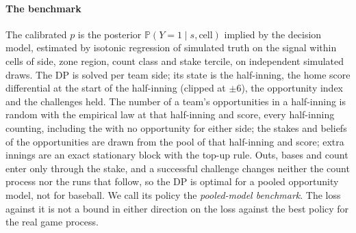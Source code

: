 \documentclass[aoas]{imsart}
\theoremstyle{plain}
\theoremstyle{definition}
\newcommand{\Prob}{\mathbb{P}}
\begin{document}
\paragraph{The benchmark} The calibrated $p$ is the posterior $\Prob(Y=1\mid s,\text{cell})$ implied by the decision
model, estimated by isotonic regression \citep{BarlowEtAl1972} of simulated truth on the signal within cells of side,
zone region, count class and stake tercile, on independent simulated draws. The DP is solved per team side; its state
is the half-inning, the home score differential at the start of the half-inning (clipped at $\pm6$), the opportunity
index and the challenges held. The number of a team's opportunities in a half-inning is random with the empirical law
at that half-inning and score, every half-inning counting, including the \NHalvesZero{} with no opportunity for either
side; the stakes and beliefs of the opportunities are drawn from the pool of that half-inning and score; extra innings
are an exact stationary block with the top-up rule. Outs, bases and count enter only through the stake, and a
successful challenge changes neither the count process nor the runs that follow, so the DP is optimal for a pooled
opportunity model, not for baseball. We call its policy the \emph{pooled-model benchmark}. The loss against it is not
a bound in either direction on the loss against the best policy for the real game process.
\end{document}
